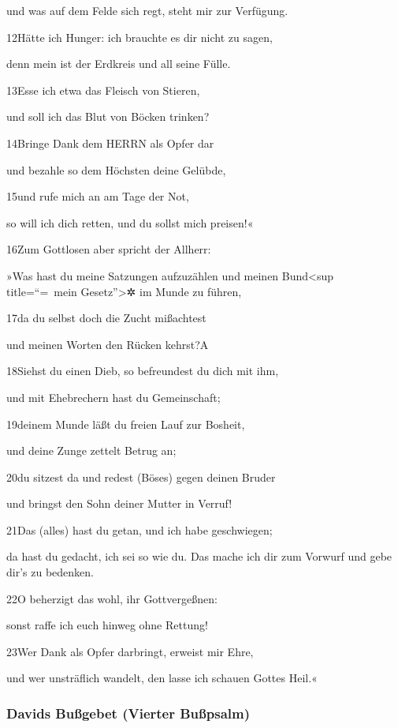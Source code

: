 und was auf dem Felde sich regt, steht mir zur Verfügung.

12Hätte ich Hunger: ich brauchte es dir nicht zu sagen,

denn mein ist der Erdkreis und all seine Fülle.

13Esse ich etwa das Fleisch von Stieren,

und soll ich das Blut von Böcken trinken?

14Bringe Dank dem HERRN als Opfer dar

und bezahle so dem Höchsten deine Gelübde,

15und rufe mich an am Tage der Not,

so will ich dich retten, und du sollst mich preisen!«

16Zum Gottlosen aber spricht der Allherr:

»Was hast du meine Satzungen aufzuzählen und meinen Bund\textless sup
title=``=~mein Gesetz''\textgreater✲ im Munde zu führen,

17da du selbst doch die Zucht mißachtest

und meinen Worten den Rücken kehrst?{A}

18Siehst du einen Dieb, so befreundest du dich mit ihm,

und mit Ehebrechern hast du Gemeinschaft;

19deinem Munde läßt du freien Lauf zur Bosheit,

und deine Zunge zettelt Betrug an;

20du sitzest da und redest (Böses) gegen deinen Bruder

und bringst den Sohn deiner Mutter in Verruf!

21Das (alles) hast du getan, und ich habe geschwiegen;

da hast du gedacht, ich sei so wie du. Das mache ich dir zum Vorwurf und
gebe dir's zu bedenken.

22O beherzigt das wohl, ihr Gottvergeßnen:

sonst raffe ich euch hinweg ohne Rettung!

23Wer Dank als Opfer darbringt, erweist mir Ehre,

und wer unsträflich wandelt, den lasse ich schauen Gottes Heil.«

\hypertarget{davids-buuxdfgebet-vierter-buuxdfpsalm}{%
\subsubsection{Davids Bußgebet (Vierter
Bußpsalm)}\label{davids-buuxdfgebet-vierter-buuxdfpsalm}}

